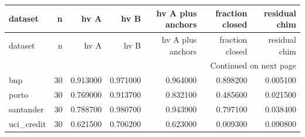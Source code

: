 \begin{center}\label{tab:s12}\end{center}
\begingroup\scriptsize\setlength{\tabcolsep}{2.5pt}
\begin{longtable}{lrrrrrr}
\toprule
dataset & n & hv A & hv B & hv A plus anchors & fraction closed & residual chim \\
\midrule
\endfirsthead
\toprule
dataset & n & hv A & hv B & hv A plus anchors & fraction closed & residual chim \\
\midrule
\endhead
\midrule
\multicolumn{7}{r}{Continued on next page} \\
\midrule
\endfoot
\bottomrule
\endlastfoot
bnp & 30 & 0.913000 & 0.971000 & 0.964000 & 0.898200 & 0.005100 \\
porto & 30 & 0.769000 & 0.913700 & 0.832100 & 0.485600 & 0.021500 \\
santander & 30 & 0.788700 & 0.980700 & 0.943900 & 0.797100 & 0.038400 \\
uci\_credit & 30 & 0.621500 & 0.706200 & 0.623000 & 0.009300 & 0.090800 \\
\end{longtable}\endgroup
